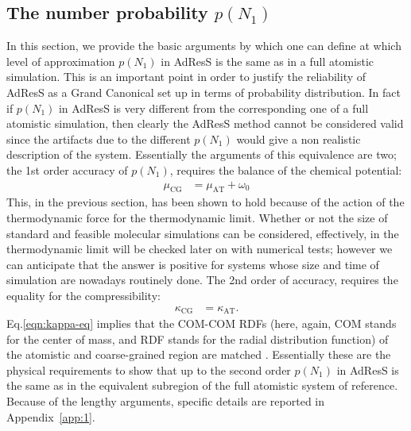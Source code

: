 \documentclass[aps,a4paper,reprint,onecolumn]{revtex4}
\newcommand{\AT}{{\textrm{{AT}}}}
\newcommand{\CG}{{\textrm{CG}}}
\begin{document}
\subsection{The number probability $p(N_1)$}
\label{sec:pn1}
In this section, we provide the basic arguments by which one can define at which level of approximation $p(N_{1})$
in AdResS is the same as in a full atomistic simulation. This is an important point
in order to justify the reliability of AdResS as a Grand
Canonical set up in terms of probability distribution. In fact if
$p(N_{1})$ in AdResS is very different from the corresponding one of a
full atomistic simulation, then clearly the AdResS method cannot be
considered valid since the artifacts due to the
different $p(N_{1})$ would give a non realistic description of the
system.
Essentially the arguments of this equivalence are two; the 1st order accuracy of  $p(N_{1})$, requires the balance of the chemical potential:
\begin{align}\label{eqn:mu-eq}
  \mu_{\CG} &= \mu_{\AT} + \omega_0
\end{align}
This, in the previous section, has been shown to hold because of the action of the thermodynamic force for the thermodynamic limit. 
Whether or not the size of standard and feasible molecular simulations can be considered, effectively, in the thermodynamic limit will be checked later on with numerical tests; however we can anticipate that the answer is positive for systems whose size and time of simulation are nowadays routinely done.
The 2nd order of accuracy, requires the equality for the compressibility:
\begin{align}\label{eqn:kappa-eq}
  \kappa_{\CG} &= \kappa_{\AT}.
\end{align}
Eq.\ref{eqn:kappa-eq} implies that the COM-COM RDFs (here, again, COM stands for the center of mass, and RDF stands for the radial distribution function) of the atomistic and coarse-grained region are matched \cite{han}.
Essentially these are the physical requirements to show that up to the second order $p(N_1)$ in AdResS is the same as in the equivalent subregion of the full atomistic system of reference.
Because of the lengthy arguments, specific details are reported in Appendix~\ref{app:1}.
\end{document}
